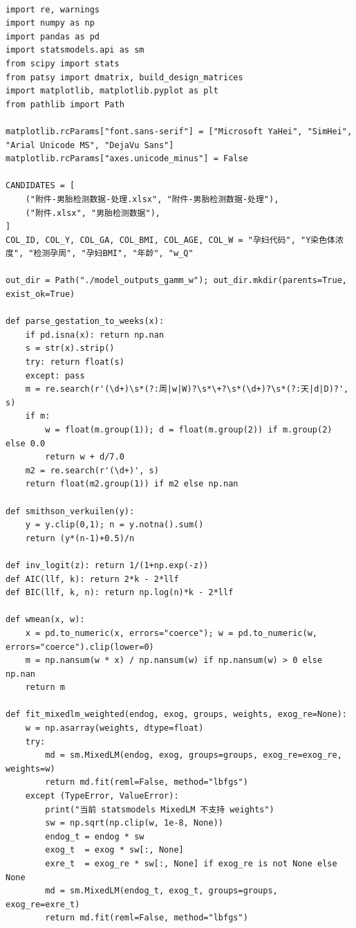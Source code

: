 \begin{lstlisting}

import re, warnings
import numpy as np
import pandas as pd
import statsmodels.api as sm
from scipy import stats
from patsy import dmatrix, build_design_matrices
import matplotlib, matplotlib.pyplot as plt
from pathlib import Path

matplotlib.rcParams["font.sans-serif"] = ["Microsoft YaHei", "SimHei", "Arial Unicode MS", "DejaVu Sans"]
matplotlib.rcParams["axes.unicode_minus"] = False

CANDIDATES = [
    ("附件-男胎检测数据-处理.xlsx", "附件-男胎检测数据-处理"),
    ("附件.xlsx", "男胎检测数据"),
]
COL_ID, COL_Y, COL_GA, COL_BMI, COL_AGE, COL_W = "孕妇代码", "Y染色体浓度", "检测孕周", "孕妇BMI", "年龄", "w_Q"

out_dir = Path("./model_outputs_gamm_w"); out_dir.mkdir(parents=True, exist_ok=True)

def parse_gestation_to_weeks(x):
    if pd.isna(x): return np.nan
    s = str(x).strip()
    try: return float(s)
    except: pass
    m = re.search(r'(\d+)\s*(?:周|w|W)?\s*\+?\s*(\d+)?\s*(?:天|d|D)?', s)
    if m:
        w = float(m.group(1)); d = float(m.group(2)) if m.group(2) else 0.0
        return w + d/7.0
    m2 = re.search(r'(\d+)', s)
    return float(m2.group(1)) if m2 else np.nan

def smithson_verkuilen(y):
    y = y.clip(0,1); n = y.notna().sum()
    return (y*(n-1)+0.5)/n

def inv_logit(z): return 1/(1+np.exp(-z))
def AIC(llf, k): return 2*k - 2*llf
def BIC(llf, k, n): return np.log(n)*k - 2*llf

def wmean(x, w):
    x = pd.to_numeric(x, errors="coerce"); w = pd.to_numeric(w, errors="coerce").clip(lower=0)
    m = np.nansum(w * x) / np.nansum(w) if np.nansum(w) > 0 else np.nan
    return m

def fit_mixedlm_weighted(endog, exog, groups, weights, exog_re=None):
    w = np.asarray(weights, dtype=float)
    try:
        md = sm.MixedLM(endog, exog, groups=groups, exog_re=exog_re, weights=w)
        return md.fit(reml=False, method="lbfgs")
    except (TypeError, ValueError):
        print("当前 statsmodels MixedLM 不支持 weights")
        sw = np.sqrt(np.clip(w, 1e-8, None))
        endog_t = endog * sw
        exog_t  = exog * sw[:, None]
        exre_t  = exog_re * sw[:, None] if exog_re is not None else None
        md = sm.MixedLM(endog_t, exog_t, groups=groups, exog_re=exre_t)
        return md.fit(reml=False, method="lbfgs")


\end{lstlisting}
